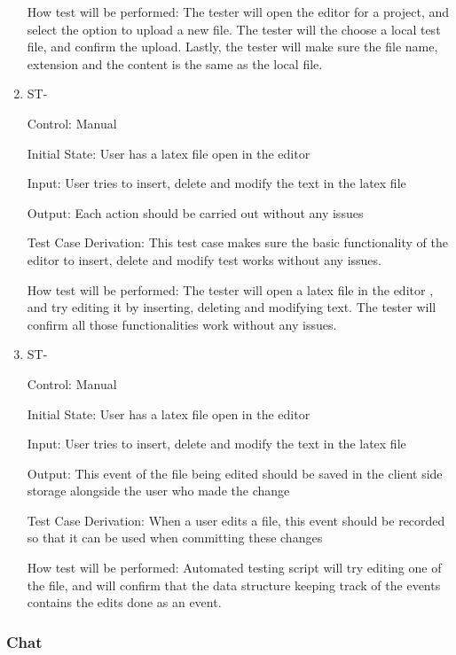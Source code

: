 \documentclass[12pt, titlepage]{article}
\newcounter{TESTID}
\newcommand\TESTNUM{\stepcounter{TESTID}\theTESTID}
\begin{document}
\begin{enumerate}
		How test will be performed: The tester will open the editor for a project, and select the option to upload a new file. The tester will the choose a local test file, and confirm the upload. Lastly, the tester will make sure the file name, extension and the content is the same as the local file.
		
		\item{ST-\TESTNUM\\}
		
		Control: Manual
		
		Initial State: User has a latex file open in the editor
		
		Input: User tries to insert, delete and modify the text in the latex file
		
		Output: Each action should be carried out without any issues
		
		Test Case Derivation: This test case makes sure the basic functionality of the editor to insert, delete and modify test works without any issues.
		
		How test will be performed: The tester will open a latex file in the editor , and try editing it by inserting, deleting and modifying text. The tester will confirm all those functionalities work without any issues.
		
		\item{ST-\TESTNUM\\}
		
		Control: Manual
		
		Initial State: User has a latex file open in the editor
		
		Input: User tries to insert, delete and modify the text in the latex file
		
		Output: This event of the file being edited should be saved in the client side storage alongside the user who made the change
		
		Test Case Derivation: When a user edits a file, this event should be recorded so that it can be used when committing these changes
		
		How test will be performed: Automated testing script will try editing one of the file, and will confirm that the data structure keeping track of the events contains the edits done as an event.
		
		
		
	\end{enumerate}
	
	\subsubsection{Chat}
	
\end{document}
